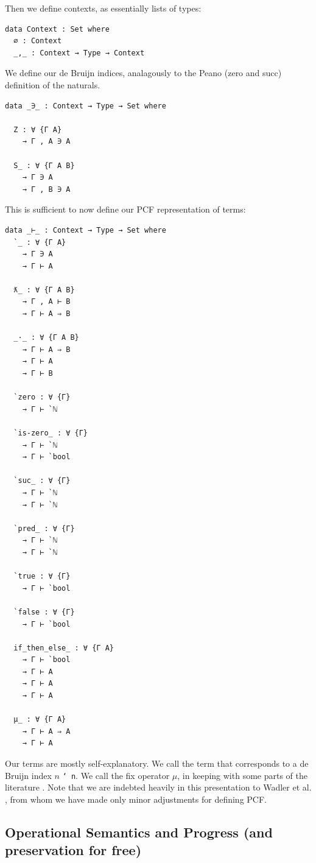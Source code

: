 \documentclass[12pt,a4paper,twoside,openright]{report}
\begin{document}
Then we define contexts, as essentially lists of types:
\begin{verbatim}
data Context : Set where
  ∅ : Context
  _,_ : Context → Type → Context
\end{verbatim}
We define our de Bruijn indices, analagously to the Peano (zero and succ) definition of the naturals. 
\begin{verbatim}
data _∋_ : Context → Type → Set where

  Z : ∀ {Γ A}
    → Γ , A ∋ A

  S_ : ∀ {Γ A B}
    → Γ ∋ A
    → Γ , B ∋ A
\end{verbatim}
This is sufficient to now define our PCF representation of terms:
\begin{verbatim}
data _⊢_ : Context → Type → Set where
  `_ : ∀ {Γ A}
    → Γ ∋ A
    → Γ ⊢ A

  ƛ_ : ∀ {Γ A B}
    → Γ , A ⊢ B
    → Γ ⊢ A ⇒ B

  _·_ : ∀ {Γ A B}
    → Γ ⊢ A ⇒ B
    → Γ ⊢ A
    → Γ ⊢ B

  `zero : ∀ {Γ}
    → Γ ⊢ `ℕ

  `is-zero_ : ∀ {Γ}
    → Γ ⊢ `ℕ
    → Γ ⊢ `bool

  `suc_ : ∀ {Γ}
    → Γ ⊢ `ℕ
    → Γ ⊢ `ℕ

  `pred_ : ∀ {Γ}
    → Γ ⊢ `ℕ
    → Γ ⊢ `ℕ

  `true : ∀ {Γ}
    → Γ ⊢ `bool

  `false : ∀ {Γ}
    → Γ ⊢ `bool

  if_then_else_ : ∀ {Γ A}
    → Γ ⊢ `bool
    → Γ ⊢ A
    → Γ ⊢ A
    → Γ ⊢ A

  μ_ : ∀ {Γ A}
    → Γ ⊢ A ⇒ A
    → Γ ⊢ A
\end{verbatim}
Our terms are mostly self-explanatory. We call the term that corresponds to a de Bruijn index $n$ \texttt{` n}. We call the fix operator $\mu$, in keeping with some parts of the literature \cite{PLFA} \cite{Kozen}. Note that we are indebted heavily in this presentation to Wadler et al. \cite{PLFA}, from whom we have made only minor adjustments for defining PCF. 
\subsection{Operational Semantics and Progress (and preservation for free)}
\end{document}
